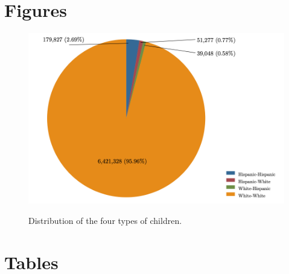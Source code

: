 \documentclass[12pt,english]{article}
\begin{document}
\pagebreak
\begingroup
{}
\setlength\bibitemsep{0pt}
\printbibliography
\endgroup
\pagebreak

\begin{appendices}
\section{Figures}\label{appendix:figs}



\begin{center}
\begin{figure}[h!]
\caption{Distribution of the four types of children.}
\includegraphics[width=\textwidth]{PirChart2.png} 
\label{fig:dist}
\end{figure}
\end{center}

\newpage


\section{Tables}\label{appendix:tabs}



\newpage




\end{appendices}
\end{document}
